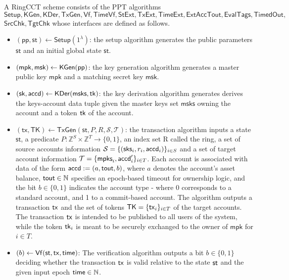 	\begin{definition}
    A RingCCT scheme consists of the PPT algorithms $\mathsf{Setup},\mathsf{KGen},\mathsf{KDer}, \mathsf{TxGen},\mathsf{Vf},\mathsf{TimeVf}, \mathsf{StExt},\mathsf{TxExt}, \mathsf{TimeExt}, \mathsf{ExtAccTout}, \mathsf{EvalTags}, \mathsf{TimedOut},$ $\mathsf{SrcChk}, \mathsf{TgtChk}$
    whose interfaces are defined as follows.
    \begin{itemize}
        \item $(\mathsf{pp,st}) \gets \mathsf{Setup}(1^\lambda)$: the setup algorithm generates the public parameters $\mathsf{st}$ and an initial global state $\mathsf{st}$.
        \item $(\mathsf{mpk},\mathsf{msk}) \gets \mathsf{KGen}(\mathsf{pp})$: the key generation algorithm generates a master public key $\mathsf{mpk}$ and a matching secret key $\mathsf{msk}$.
        \item $(\mathsf{sk},\mathsf{accd}) \gets \mathsf{KDer}(\mathsf{msks, \mathsf{tk}})$: the key derivation algorithm generates derives the keys-account data tuple given the master keys set $\mathsf{msks}$ owning the account and a token $\mathsf{tk}$ of the account.
	\item $(\mathsf{tx,TK}) \gets \mathsf{TxGen}(\mathsf{st},P,R,\mathcal{S},\mathcal{T})$: the transaction algorithm inputs a state $\mathsf{st}$, a predicate $P: \mathbb{Z}^S \times \mathbb{Z}^T \rightarrow \{0,1\}$, an index set R called the ring, a set of source accounts information $\mathcal{S} = \{(\mathsf{sks}_i, r_i, \mathsf{accd}_i)\}_{i\in S}$ and a set of target account information $\mathcal{T} = \{\mathsf{mpks}_i, \mathsf{accd}'_i\}_{i\in T}$. Each account is associated with data of the form $\mathsf{accd} := (a, \mathsf{tout}, b)$, where $a$ denotes the account's asset balance, $\mathsf{tout} \in \mathbb{N}$ specifies an epoch-based timeout for ownership logic, and the bit $b \in \{ 0, 1 \}$ indicates the account type - where 0 corresponds to a standard account, and 1 to a commit-based account. The algorithm outputs a transaction $\mathsf{tx}$ and the set of tokens $\mathsf{TK} = \{ \mathsf{tx}_i \}_{i \in T}$ of the target accounts. The transaction $\mathsf{tx}$ is intended to be published to all users of the system, while the token $\mathsf{tk}_i$ is meant to be securely exchanged to the owner of $\mathsf{mpk}$ for $i \in T$.
        \item $(b) \gets \mathsf{Vf}(\st,\tx, \time)$: The verification algorithm outputs a bit $b \in \{ 0, 1 \}$ deciding whether the transaction $\mathsf{tx}$ is valid relative to the state $\st$ and the given input epoch $\mathsf{time} \in \mathbb{N}$.

\end{itemize}
\end{definition}
